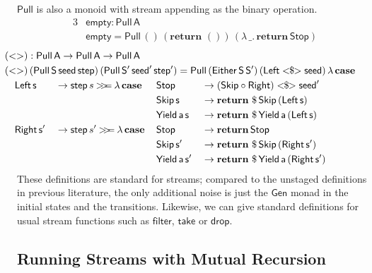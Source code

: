 \documentclass[acmsmall,screen,review,anonymous]{acmart}
\newcommand{\mit}[1]{{\mathsf{#1}}}
\newcommand{\msf}[1]{{\mathsf{#1}}}
\newcommand{\mbf}[1]{{\mathbf{#1}}}
\newcommand{\ind}{\hspace{1em}}
\newcommand{\return}{\mbf{return}\,}
\newcommand{\lam}{\lambda\,}
\newcommand{\vA}{\mathsf{A}}
\newcommand{\vS}{\mathsf{S}}
\newcommand{\va}{\mathsf{a}}
\newcommand{\vs}{\mathsf{s}}
\newcommand{\case}{\mbf{case\,}}
\newcommand{\bind}{\mathbin{>\!\!>\mkern-6.7mu=}}
\theoremstyle{remark}
\newcommand{\Gen}{\msf{Gen}}
\newcommand{\fmap}{<\!\!\$\!\!>}
\newcommand{\Either}{\msf{Either}}
\newcommand{\Left}{\msf{Left}}
\newcommand{\Right}{\msf{Right}}
\newcommand{\Stop}{\msf{Stop}}
\newcommand{\Skip}{\msf{Skip}}
\newcommand{\Yield}{\msf{Yield}}
\newcommand{\dlr}{\,\$\,}
\newcommand{\seed}{\mit{seed}}
\newcommand{\step}{\mit{step}}
\newcommand{\Pull}{\msf{Pull}}
\begin{document}
$\Pull$ is also a monoid with stream appending as the binary operation.
\begin{alignat*}{3}
  & \mit{empty} : \Pull\,\vA\\
  & \mit{empty} = \Pull\,()\,(\return\,())\,(\lam \_.\,\return \Stop)
\end{alignat*}
\begin{alignat*}{5}
  & \hspace{-5em}\mathrlap{({<>}) : \Pull\,\vA \to \Pull\,\vA \to \Pull\,\vA} \\
  & \hspace{-5em}\mathrlap{({<>})\,(\Pull\,\vS\,\seed\,\step)\,(\Pull\,\vS'\,\seed'\,\step') = \Pull\,(\Either\,\vS\,\vS')\,(\Left \fmap \seed)\,\lam \case} \\
  & \hspace{-5em}\ind \Left\,\vs &&\to \step\,s \bind \lam \case &&\Stop             &&\to (\Skip \circ \Right) \fmap \seed'\\
  & \hspace{-5em}                    &&                          &&\Skip\,\vs        &&\to \return \dlr \Skip\,(\Left\,\vs) \\
  & \hspace{-5em}                    &&                        &&\Yield\,\va\,\vs    &&\to \return \dlr \Yield\,\va\,(\Left\,\vs)\\
  & \hspace{-5em}\ind \Right\,\vs' &&\to \step\,s' \bind \lam \case &&\Stop          &&\to \return \Stop\\
  & \hspace{-5em}                    &&                        &&\Skip\,\vs'         &&\to \return \dlr \Skip\,(\Right\,\vs') \\
  & \hspace{-5em}                    &&                        &&\Yield\,\va\,\vs'   &&\to \return \dlr \Yield\,\va\,(\Right\,\vs')
\end{alignat*}
These definitions are standard for streams; compared to the unstaged definitions
in previous literature, the only additional noise is just the $\Gen$ monad in
the initial states and the transitions. Likewise, we can give standard
definitions for usual stream functions such as $\msf{filter}$, $\msf{take}$ or
$\msf{drop}$.

\subsection{Running Streams with Mutual Recursion}
\end{document}

